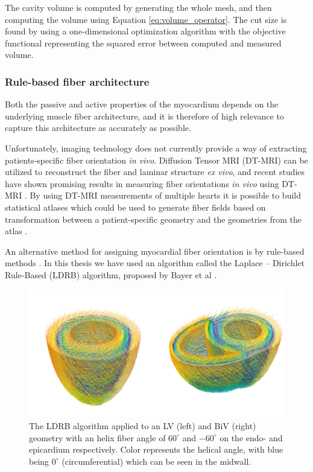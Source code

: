 \begin{remark}
  The cavity volume is computed by generating the whole mesh, and then
  computing the volume using Equation \eqref{eq:volume_operator}. The cut size is
  found by using a one-dimensional optimization algorithm with
  the objective functional representing the squared error between
  computed and measured volume.
\end{remark}




\subsubsection{Rule-based fiber architecture}
\label{sec:rule_based_fiber}
Both the passive and active properties of the myocardium depends on
the underlying muscle fiber architecture, and it is therefore of high
relevance to capture this architecture as accurately as
possible.


Unfortunately, imaging technology does not currently provide a
way of extracting patients-specific fiber orientation \emph{in
  vivo}. Diffusion Tensor MRI (DT-MRI) \cite{basser1994mr} can
be utilized to reconstruct the fiber and laminar structure \emph{ex
  vivo}\cite{rohmer2007reconstruction}, and recent studies have shown
promising results in measuring fiber orientations \emph{in vivo} using
DT-MRI \cite{toussaint2013vivo}. 
By using DT-MRI measurements of multiple hearts it is possible to build
statistical atlases \cite{peyrat2006towards} which could be used to
generate fiber fields based on transformation between a patient-specific
geometry and the geometries from the atlas \cite{vadakkumpadan2010modeling}.

An alternative method for assigning myocardial fiber orientation is by
rule-based methods \cite{potse2006comparison, bayer2012novel}. 
In this thesis we have used an algorithm called the Laplace – Dirichlet
Rule-Based (LDRB) algorithm, proposed by Bayer et al \cite{bayer2012novel}.


\begin{figure}[htbp]
  \centering
  \includegraphics[width=\textwidth]
  {chapters/introduction/figures/fiber/fiber}
\caption{The LDRB algorithm \cite{bayer2012novel} applied to an LV
  (left) and BiV (right) geometry with an helix fiber angle of
  $60^{\circ}$ and $-60^{\circ}$ on the endo- and epicardium
  respectively. Color represents the helical angle, with blue being
  $0^{\circ}$ (circumferential) which can be seen in the midwall. }
\label{fig:rule_based_fiber}
\end{figure}


